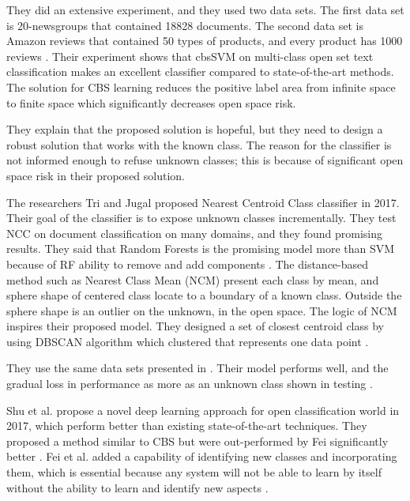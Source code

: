 \documentclass[conference]{IEEEtran}
\begin{document}
 
 \par They did an extensive experiment, and they used two data sets. The first data set is  20-newsgroups that contained 18828 documents. The second data set is  Amazon reviews that contained 50 types of products, and every product has 1000 reviews \cite{rennie200820} \cite{jindal2008opinion}. Their experiment shows that cbsSVM on multi-class open set text classification makes an excellent classifier compared to state-of-the-art methods. The solution for CBS learning reduces the positive label area from infinite space to finite space which significantly decreases open space risk. 
 
\par They explain that the proposed solution is hopeful, but they need to design a robust solution that works with the known class. The reason for the classifier is not informed enough to refuse unknown classes; this is because of significant open space risk in their proposed solution.





\par   The researchers Tri and Jugal  proposed Nearest Centroid Class classifier in 2017. Their goal of the classifier is to expose unknown classes incrementally. They test NCC on document classification on many domains, and they found promising results. They said that Random Forests is the promising model more than SVM because of RF ability to remove and add components \cite{doanbreaking}. 
The distance-based method such as  Nearest Class Mean (NCM) present each class by mean, and sphere shape of centered class locate to a boundary of a known class. Outside the sphere shape is an outlier on the unknown, in the open space. The logic of NCM inspires their proposed model. They designed a set of closest centroid class by using DBSCAN algorithm which clustered that represents one data point \cite{doanbreaking}. 



\par They use the same data sets presented in \cite{rennie200820} \cite{jindal2008opinion}. Their model performs well, and the gradual loss in performance as more as an unknown class shown in testing \cite{doanbreaking}. 



\par Shu et al.  propose a novel deep learning approach for open classification world in 2017, which perform better than existing state-of-the-art techniques. They proposed a method similar to CBS but were out-performed by Fei significantly better \cite{fei2016learning}. Fei et al.  added a capability of identifying new classes and incorporating them, which is essential because any system will not be able to learn by itself without the ability to learn and identify new aspects \cite{chen2016lifelong} \cite{fei2016learning}. 
\end{document}
